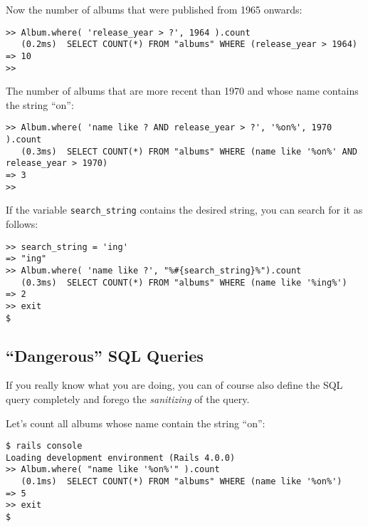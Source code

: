 \documentclass[a4paper]{book}
\begin{document}
Now the number of albums that were published from 1965 onwards:

\begin{shaded}\begin{verbatim}
>> Album.where( 'release_year > ?', 1964 ).count
   (0.2ms)  SELECT COUNT(*) FROM "albums" WHERE (release_year > 1964)
=> 10
>>
\end{verbatim}\end{shaded}

The number of albums that are more recent than 1970 and whose name contains the string “on”:

\begin{shaded}\begin{verbatim}
>> Album.where( 'name like ? AND release_year > ?', '%on%', 1970 ).count
   (0.3ms)  SELECT COUNT(*) FROM "albums" WHERE (name like '%on%' AND release_year > 1970)
=> 3
>>
\end{verbatim}\end{shaded}

If the variable \texttt{search\_string} contains the desired string, you can search for it as follows:

\begin{shaded}\begin{verbatim}
>> search_string = 'ing'
=> "ing"
>> Album.where( 'name like ?', "%#{search_string}%").count
   (0.3ms)  SELECT COUNT(*) FROM "albums" WHERE (name like '%ing%')
=> 2
>> exit
$
\end{verbatim}\end{shaded}

\subsection{“Dangerous” SQL Queries}\label{dangerous-sql-queries}

If you really know what you are doing, you can of course also define the SQL query completely and forego the \emph{sanitizing} of the query.

Let's count all albums whose name contain the string “on”:

\begin{shaded}\begin{verbatim}
$ rails console
Loading development environment (Rails 4.0.0)
>> Album.where( "name like '%on%'" ).count
   (0.1ms)  SELECT COUNT(*) FROM "albums" WHERE (name like '%on%')
=> 5
>> exit
$
\end{verbatim}\end{shaded}
\end{document}
